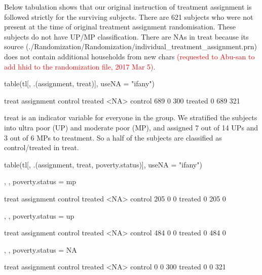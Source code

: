 	Below tabulation shows that our original instruction of treatment assignment is followed strictly for the surviving subjects. There are 621 subjects who were not present at the time of original treatment assignment randomisation. These subjects do not have UP/MP classification. There are NAs in \textsf{treat} because its source (\textsf{\footnotesize./Randomization/Randomization/individual\_treatment\_assignment.prn}) does not contain additional households from new chars \textcolor{red}{(requested to Abu-san to add \textsf{hhid} to the randomization file, 2017 Mar 5).}
\begin{Schunk}
\begin{Sinput}
table(tl[, .(assignment, treat)], useNA = "ifany")
\end{Sinput}
\begin{Soutput}
          treat
assignment control treated <NA>
   control     689       0  300
   treated       0     689  321
\end{Soutput}
\end{Schunk}
\textsf{treat} is an indicator variable for everyone in the group. We stratified the subjects into ultra poor (UP) and moderate poor (MP), and assigned 7 out of 14 UPs and 3 out of 6 MPs to treatment. So a half of the subjects are classified as control/treated in \textsf{treat}.
\begin{Schunk}
\begin{Sinput}
table(tl[, .(assignment, treat, poverty.status)], useNA = "ifany")
\end{Sinput}
\begin{Soutput}
, , poverty.status = mp

          treat
assignment control treated <NA>
   control     205       0    0
   treated       0     205    0

, , poverty.status = up

          treat
assignment control treated <NA>
   control     484       0    0
   treated       0     484    0

, , poverty.status = NA

          treat
assignment control treated <NA>
   control       0       0  300
   treated       0       0  321
\end{Soutput}
\end{Schunk}

